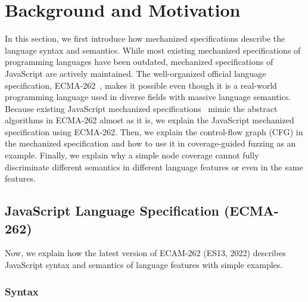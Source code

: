 \section{Background and Motivation}\label{sec:motivation}

In this section, we first introduce how mechanized specifications describe the
language syntax and semantics.
%
While most existing mechanized specifications of programming languages have been
outdated, mechanized specifications of JavaScript are actively maintained.
%
The well-organized official language specification, ECMA-262~\cite{es13}, makes
it possible even though it is a real-world programming language used in diverse
fields with massive language semantics.
%
Because existing JavaScript mechanized specifications~\cite{kjs, javert, jiset,
skel-js} mimic the abstract algorithms in ECMA-262 almost as it is, we explain
the JavaScript mechanized specification using ECMA-262.
%
Then, we explain the control-flow graph (CFG) in the mechanized specification
and how to use it in coverage-guided fuzzing as an example.
%
Finally, we explain why a simple node coverage cannot fully discriminate
different semantics in different language features or even in the same features.


\subsection{JavaScript Language Specification (ECMA-262)}\label{sec:ecma-262}

Now, we explain how the latest version of ECAM-262 (ES13, 2022) describes
JavaScript syntax and semantics of language features with simple examples. 


\subsubsection{Syntax}\label{sec:syntax}

